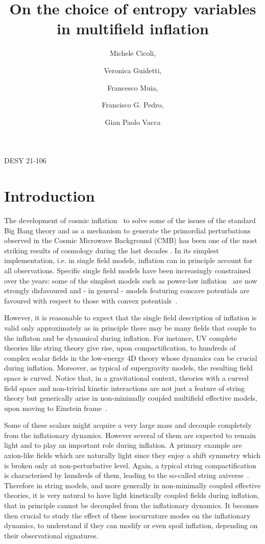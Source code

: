 \documentclass[a4paper,11pt]{article}
\title{On the choice of entropy variables in multifield inflation}
\author[a,b]{Michele Cicoli,}
\author[c]{Veronica Guidetti,}
\author[d]{Francesco Muia,}
\author[a,b]{Francisco G. Pedro,}
\author[b]{Gian Paolo Vacca}
\affiliation[a]{\footnotesize Dipartimento di Fisica e Astronomia, Universitá di Bologna, via Irnerio 46, 40126 Bologna, Italy}
\affiliation[b]{\footnotesize INFN, Sezione di Bologna, via Irnerio 46, 40126 Bologna, Italy}
\affiliation[c]{\footnotesize Deutsches Elektronen-Synchrotron (DESY), 22607 Hamburg, Germany}
\affiliation[d]{\footnotesize DAMTP, University of Cambridge, Wilberforce Road, Cambridge, CB3 0WA, UK}
\begin{document}
 
\hfill DESY 21-106

\maketitle
\flushbottom





\section{Introduction}
\label{Intro}

The development of cosmic inflation~\cite{Guth:1980zm, Linde:1981mu, Albrecht:1982wi} to solve some of the issues of the standard Big Bang theory and as a mechanism to generate the primordial perturbations observed in the Cosmic Microwave Background (CMB) has been one of the most striking results of cosmology during the last decades \cite{Baumann:2009ds, Akrami:2018odb}. In its simplest implementation, i.e. in single field models, inflation can in principle account for all observations. Specific single field models have been increasingly constrained over the years: some of the simplest models such as power-law inflation~\cite{Linde:1983gd} are now strongly disfavoured and - in general - models featuring concave potentials are favoured with respect to those with convex potentials~\cite{Akrami:2018odb}. 

However, it is reasonable to expect that the single field description of inflation is valid only approximately as in principle there may be many fields that couple to the inflaton and be dynamical during inflation. For instance, UV complete theories like string theory give rise, upon compactification, to hundreds of complex scalar fields in the low-energy 4D theory whose dynamics can be crucial during inflation. Moreover, as typical of supergravity models, the resulting field space is curved. Notice that, in a gravitational context, theories with a curved field space and non-trivial kinetic interactions are not just a feature of string theory but generically arise in non-minimally coupled multifield effective models, upon moving to Einstein frame~\cite{Kaiser:2010ps,Kaiser:2012ak, Schutz:2013fua, DiMarco:2002eb}. 

Some of these scalars might acquire a very large mass and decouple completely from the inflationary dynamics. However several of them are expected to remain light and to play an important role during inflation. A primary example are axion-like fields which are naturally light since they enjoy a shift symmetry which is broken only at non-perturbative level. Again, a typical string compactification is characterised by hundreds of them, leading to the so-called string axiverse~\cite{Svrcek:2006yi, Conlon:2006tq, Arvanitaki:2009fg, Cicoli:2012sz}. Therefore in string models, and more generally in non-minimally coupled effective theories, it is very natural to have light kinetically coupled fields during inflation, that in principle cannot be decoupled from the inflationary dynamics. It becomes then crucial to study the effect of these isocurvature modes on the inflationary dynamics, to understand if they can modify or even spoil inflation, depending on their observational signatures.
\end{document}
